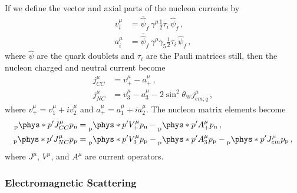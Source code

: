   If we define the vector and axial parts of the nucleon currents by
  \begin{equation}
    \begin{aligned}
    v^{\mu}_i &= \bar{\hat{\psi}}_f\, \gamma^{\mu}\frac{1}{2}\tau_i\, \hat{\psi}_f \,, \\
    a^{\mu}_i &= \bar{\hat{\psi}}_f\, \gamma^{\mu}\gamma_5\frac{1}{2}\tau_i\, \hat{\psi}_f \,,
    \end{aligned}
  \end{equation}
  where $\hat{\psi}$ are the quark doublets and $\tau_i$ are the Pauli matrices
  still, then the nucleon charged and neutral current become
  \begin{equation}
    \begin{aligned}
      j^{\mu}_{CC} &= v^{\mu}_+ - a^{\mu}_+ \,, \\
      j^{\mu}_{NC} &= v^{\mu}_3 - a^{\mu}_3 - 2\sin^2\theta_W j^{\mu}_{em;q} \,,
    \end{aligned}
  \end{equation}
  where $v^{\mu}_+ = v^{\mu}_1 + iv^{\mu}_2$ and $a^{\mu}_+ = a^{\mu}_1 +
  ia^{\mu}_2$. The nucleon matrix elements become
  \begin{equation}
    \begin{aligned}
      _{\textrm{p}}\phys*{p'}{J^{\mu}_{CC}}{p}_{\textrm{n}}
          &= \prescript{}{\textrm{p}}{\phys*{p'}{V^{\mu}_{+}}{p}}_{\textrm{n}}
            - \prescript{}{\textrm{p}}{\phys*{p'}{A^{\mu}_{+}}{p}}_{\textrm{n}} \,, \\
      _{\textrm{p}}\phys*{p'}{J^{\mu}_{NC}}{p}_{\textrm{p}}
          &= \prescript{}{\textrm{p}}{\phys*{p'}{V^{\mu}_{3}}{p}}_{\textrm{p}} 
            - \prescript{}{\textrm{p}}{\phys*{p'}{A^{\mu}_{3}}{p}}_{\textrm{p}} 
            - \prescript{}{\textrm{p}}{\phys*{p'}{J^{\mu}_{em}}{p}}_{\textrm{p}} \,,
    \end{aligned}
  \end{equation}
  where $J^{\mu}$, $V^{\mu}$, and $A^{\mu}$ are current operators.

  \subsubsection{Electromagnetic Scattering}

